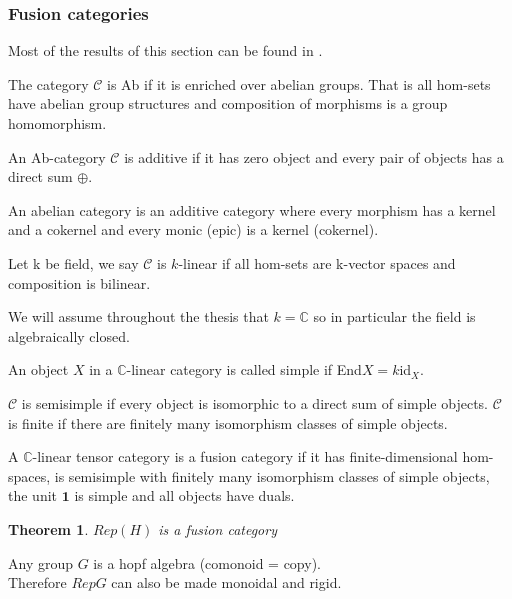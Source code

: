 \documentclass{article}
\newtheorem{theorem}{Theorem}[section]
\newenvironment{definition}[1][Definition]{\begin{trivlist}
\item[\hskip \labelsep {\bfseries #1}]}{\end{trivlist}}
\newenvironment{example}[1][Example]{\begin{trivlist}
\item[\hskip \labelsep {\bfseries #1}]}{\end{trivlist}}
\begin{document}
\subsubsection{Fusion categories}
Most of the results of this section can be found in \cite{Bartlett15}.
\begin{definition}
The category $\mathcal{C}$ is Ab if it is enriched over abelian groups. That is all hom-sets have abelian group structures and composition of morphisms is a group homomorphism. 
\end{definition}
\begin{definition}
An Ab-category $\mathcal{C}$ is additive if it has zero object and every pair of objects has a direct sum $\oplus$.
\end{definition}
\begin{definition}
An abelian category is an additive category where every morphism has a kernel and a
cokernel and every monic (epic) is a kernel (cokernel).
\end{definition}
\begin{definition}
Let k be field, we say $\mathcal{C}$ is $k$-linear if all hom-sets are k-vector spaces and composition is bilinear.
\end{definition}
We will assume throughout the thesis that $k=\mathbb{C}$ so in particular the field is algebraically closed. 
\begin{definition}
An object $X$ in a $\mathbb{C}$-linear category is called simple if End$X=k$id$_X$.
\end{definition}
\begin{definition}
$\mathcal{C}$ is semisimple if every object is isomorphic to a direct sum of simple objects. $\mathcal{C}$ is finite if there are finitely many isomorphism classes of simple objects.
\end{definition}
\begin{definition}
A $\mathbb{C}$-linear tensor category is a fusion category if it has finite-dimensional hom-spaces, is semisimple with finitely many isomorphism classes of simple objects, the unit $\mathbf{1}$ is simple  and all objects have duals.
\end{definition}

\begin{theorem}
$Rep(H)$ is a fusion category
\end{theorem}

\begin{example}
Any group $G$ is a hopf algebra (comonoid = copy).\\
Therefore $RepG$ can also be made monoidal and rigid.
\end{example}
\end{document}
